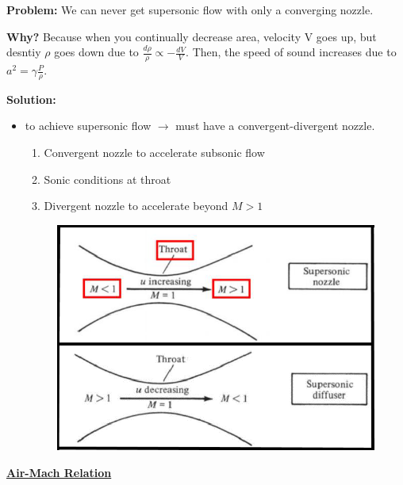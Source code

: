 \textbf{Problem:} We can never get supersonic flow with only a converging nozzle.

\textbf{Why?} Because when you continually decrease area, {\color{blue}velocity V goes up}, but {\color{red}desntiy $\rho$ goes down due to $\frac{d\rho}{\rho}\propto - \frac{dV}{V}$}. Then, the speed of sound increases due to $a^2 = \gamma \frac{P}{\rho}$.

\textbf{Solution:}
\begin{itemize}
    \item to achieve supersonic flow $\rightarrow$ must have a convergent-divergent nozzle.
    \begin{enumerate}
        \item {\color{blue}Convergent nozzle} to accelerate subsonic flow
        \item Sonic conditions at {\color{blue} throat}
        \item {\color{blue}Divergent nozzle} to accelerate beyond $M>1$
    \end{enumerate}
    \begin{figure}[H]
        \centering
        \includegraphics[width=1.0\linewidth]{images/supersonic_nozzle_diffuser.png}
    \end{figure}
\end{itemize}

\Large \textbf{\underline{\color{blue}Air-Mach Relation\color{black}}}
\vspace{3mm}

